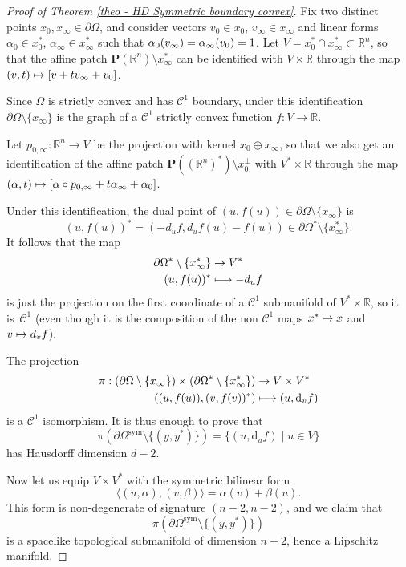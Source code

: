 \documentclass[10pt,a4paper]{amsart}
\newcommand{\sym}{\mathrm{sym}}
\newcommand\mto{\mathchoice{\longmapsto}{\mapsto}{\mapsto}{\mapsto}}
\theoremstyle{definition}
\newcommand{\proj}{\mathbf{P}}
\newcommand{\R}{\mathbb{R}}
\begin{document}
\begin{proof}[Proof of Theorem \ref{theo - HD Symmetric boundary convex}]
Fix two distinct points $x_0,x_\infty\in \partial \Omega$, and consider vectors $v_0\!\in\!x_0$, $v_\infty\!\in\!x_\infty$ and linear forms $\alpha_0\!\in\!x_0^*$, $\alpha_\infty\!\in\!x_\infty^*$ such that $\alpha_0(v_\infty)=\alpha_\infty(v_0)=\nobreak1$. Let $V=x_0^*\cap x_\infty^*\subset \R^n$, so that the affine patch $\proj(\R^n)\setminus x_\infty^*$ can be identified with $V\times \R$ through the map $(v,t)\mto [v+tv_\infty+v_0]$.

Since $\Omega$ is strictly convex and has $\mathcal C^1$ boundary, under this identification $\partial\Omega\setminus \{x_\infty\}$ is the graph of a $\mathcal C^1$ strictly convex function $f:V\to \R$.

Let $p_{0,\infty}:\R^n\to V$ be the projection with kernel $x_0\oplus x_\infty$, so that we also get an identification of the affine patch $\proj\left((\R^n)^*\right)\setminus x_0^\perp$ with $V^*\times \R$ through the map $(\alpha,t)\mto [\alpha\circ p_{0,\infty} + t \alpha_\infty + \alpha_0]$.

Under this identification, the dual point of $(u,f(u))\in \partial \Omega\setminus \{x_\infty\}$ is
\[
(u,f(u))^*=(-d_uf,d_uf(u)-f(u))\in \partial\Omega^*\setminus \{x_\infty^*\}.
\]
It follows that the map
\begin{align*}
\partial\Omega^*\setminus \{x_\infty^*\} & \to V^* \\
(u,f(u))^* & \mto -d_uf
\end{align*}
is just the projection on the first coordinate of a $\mathcal C^1$ submanifold of $V^*\times \R$, so it is~$\mathcal C^1$ (even though it is the composition of the non $\mathcal C^1$ maps $x^*\mto x$ and $v\mto d_vf$).

The projection
\begin{align*}
\pi: \left(\partial \Omega \setminus \{x_\infty\}\right)\times \left(\partial \Omega^*\setminus \{x_\infty^*\}\right) & \to V\times V^*\\
\left((u, f(u)), (v,f(v))^*\right) & \mto (u, \mathrm d_v f)
\end{align*}
is a $\mathcal C^1$ isomorphism. It is thus enough to prove that
\[\pi(\partial \Omega^{\sym} \setminus \{(y,y^*)\}) = \{(u, \mathrm d_u f)\mid u\in V\}\]
has Hausdorff dimension $d-2$.

Now let us equip $V \times V^*$ with the symmetric bilinear form
\[\langle (u,\alpha), (v,\beta)\rangle = \alpha(v) + \beta(u).\]
This form is non-degenerate of signature $(n-2,n-2)$, and we claim that
\[
\pi(\partial \Omega^{\sym} \setminus \{(y,y^*)\})
\]
is a spacelike topological submanifold of dimension $n-2$, hence a Lipschitz manifold.


\end{proof}
\end{document}
